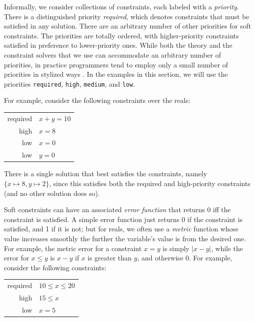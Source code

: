 Informally, we consider collections of constraints, each labeled with
a \emph{priority}.  There is a distinguished priority \emph{required},
which denotes constraints that must be satisfied in any solution.
There are an arbitrary number of other priorities for soft
constraints.  The priorities are totally ordered, with higher-priority
constraints satisfied in preference to lower-priority ones.  While
both the theory and the constraint solvers that we use can accommodate
an arbitrary number of priorities, in practice programmers tend to
employ only a small number of priorities in stylized ways
\cite{badros-tochi-2001}.  In the examples in this section, we will
use the priorities \lstinline{required}, \lstinline{high},
\lstinline{medium}, and \lstinline{low}.

For example, consider the following constraints over the reals:

\begin{center}
\begin{tabular}{rl}
required &     $x+y=10$ \\
high     &     $x=8$ \\
low      &     $x=0$ \\
low      &     $y=0$
\end{tabular}
\end{center}

There is a single solution that best satisfies the constraints, namely
$\{x \mapsto 8, y \mapsto 2\}$, since this satisfies both the required
and high-priority constraints (and no other solution does so).

Soft constraints can have an associated \emph{error function} that
returns 0 iff the constraint is satisfied.  A simple error function
just returns 0 if the constraint is satisfied, and 1 if it is not; but
for reals, we often use a \emph{metric} function whose value increases
smoothly the further the variable's value is from the desired one.
For example, the metric error for a constraint $x=y$ is simply
$|x-y|$, while the error for $x \leq y$ is $x-y$ if $x$ is greater
than $y$, and otherwise 0.  For example, consider the following
constraints:

\begin{center}
\begin{tabular}{rl}
required &  $10 \leq x \leq 20$ \\
high     &  $15 \leq x$ \\
low      &  $x=5$
\end{tabular}
\end{center}

